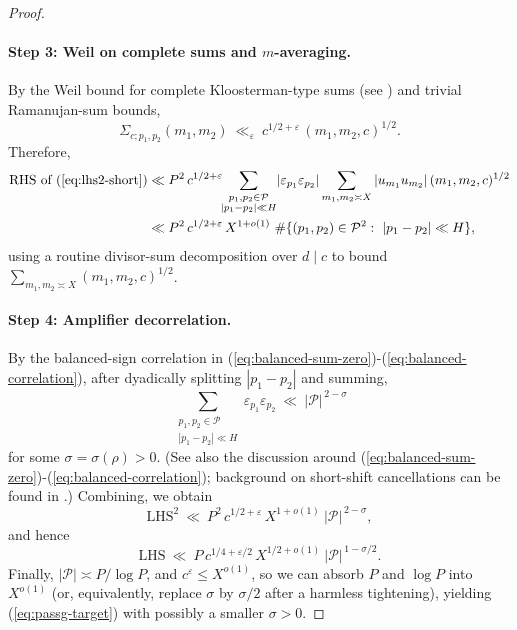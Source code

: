\documentclass[11pt]{article}
\def\eqref#1{(\ref{#1})}%
\theoremstyle{definition}
\theoremstyle{remark}
\numberwithin{equation}{part}
\begin{document}
\begin{proof}
	\paragraph{Step 3: Weil on complete sums and $m$-averaging.}
	By the Weil bound for complete Kloosterman-type sums (see \cite[Ch.~11, \S11.10]{IK}) and trivial Ramanujan-sum bounds,
	\begin{equation}\label{eq:weil}
		\Sigma_{c;p_1,p_2}(m_1,m_2)\ \ll_\varepsilon\ c^{1/2+\varepsilon}\,(m_1,m_2,c)^{1/2}.
	\end{equation}
	Therefore,
	\begin{align*}
		\text{RHS of }\eqref{eq:lhs2-short}
		 & \ll P^2\, c^{1/2+\varepsilon}\!\!\sum_{\substack{p_1,p_2\in\mathcal P                        \\ |p_1-p_2|\ll H}}\! |\varepsilon_{p_1}\varepsilon_{p_2}|
		\sum_{m_1,m_2\asymp X} |u_{m_1}u_{m_2}|\,(m_1,m_2,c)^{1/2}                                      \\
		 & \ll P^2\, c^{1/2+\varepsilon}\, X^{1+o(1)}\ \#\{(p_1,p_2)\in\mathcal P^2:\ |p_1-p_2|\ll H\},
	\end{align*}
	using a routine divisor-sum decomposition over $d\mid c$ to bound $\sum_{m_1,m_2\asymp X}(m_1,m_2,c)^{1/2}$.

	\paragraph{Step 4: Amplifier decorrelation.}
	By the balanced-sign correlation in \eqref{eq:balanced-sum-zero}-\eqref{eq:balanced-correlation}, after dyadically splitting $|p_1-p_2|$ and summing,
	\begin{equation}\label{eq:paircount}
		\sum_{\substack{p_1,p_2\in\mathcal P\\ |p_1-p_2|\ll H}} \varepsilon_{p_1}\varepsilon_{p_2}\ \ll\ |\mathcal P|^{\,2-\sigma}
	\end{equation}
	for some $\sigma=\sigma(\rho)>0$.
	(See also the discussion around \eqref{eq:balanced-sum-zero}-\eqref{eq:balanced-correlation}; background on short-shift cancellations can be found in \cite[Ch.~2]{GrahamKolesnik}.)
	Combining, we obtain
	\[
		\text{LHS}^2\ \ll\ P^2\, c^{1/2+\varepsilon}\, X^{1+o(1)}\ |\mathcal P|^{\,2-\sigma},
	\]
	and hence
	\[
		\text{LHS}\ \ll\ P\, c^{1/4+\varepsilon/2}\, X^{1/2+o(1)}\ |\mathcal P|^{\,1-\sigma/2}.
	\]
	Finally, $|\mathcal P|\asymp P/\log P$, and $c^{\varepsilon}\le X^{o(1)}$, so we can absorb $P$ and $\log P$ into $X^{o(1)}$ (or, equivalently, replace $\sigma$ by $\sigma/2$ after a harmless tightening), yielding \eqref{eq:passg-target} with possibly a smaller $\sigma>0$.
\end{proof}
\end{document}
